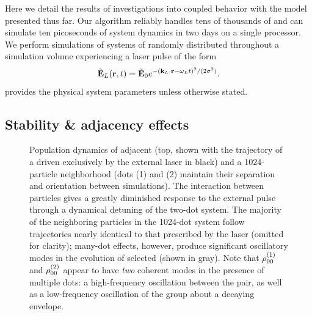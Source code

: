Here we detail the results of investigations into coupled \qd{} behavior with the model presented thus far.
Our algorithm reliably handles tens of thousands of \qds{} and can simulate ten picoseconds of system dynamics in two days on a single processor.
We perform simulations of systems of \qds{} randomly distributed throughout a simulation volume experiencing a laser pulse of the form
\begin{equation}
  \tilde{\mathbf{E}}_L(\vb{r}, t) = \tilde{\mathbf{E}}_0 e^{-(\vb{k}_L \cdot \vb{r} - \omega_L t)^2/(2\sigma^2)}.
  \label{eq:pulse envelope}
\end{equation}
 provides the physical system parameters unless otherwise stated.

\subsection{Stability \& adjacency effects}

\begin{figure}
  
  \caption{\label{fig:density stats}Population dynamics of adjacent \qds{} (top, shown with the trajectory of a \qd{} driven exclusively by the external laser in black) and a 1024-particle neighborhood (dots (1) and (2) maintain their separation and orientation between simulations).
    The interaction between particles gives a greatly diminished response to the external pulse through a dynamical detuning of the two-dot system.
    The majority of the neighboring particles in the 1024-dot system follow trajectories nearly identical to that prescribed by the laser (omitted for clarity); many-dot effects, however, produce significant oscillatory modes in the evolution of selected \qds{} (shown in gray).
    Note that $\rho_{00}^{\qty(1)}$ and $\rho_{00}^{\qty(2)}$ appear to have \emph{two} coherent modes in the presence of multiple dots: a high-frequency oscillation between the pair, as well as a low-frequency oscillation of the group about a decaying envelope.
}
\end{figure}

